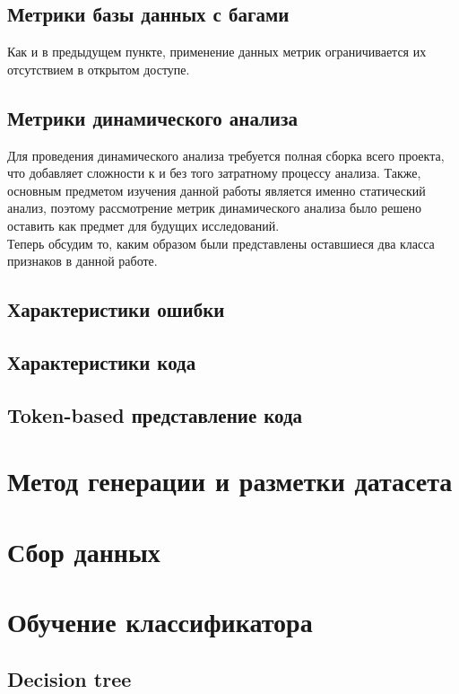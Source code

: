 \subsection{Метрики базы данных с багами}
Как и в предыдущем пункте, применение данных метрик ограничивается их отсутствием в открытом доступе.

\subsection{Метрики динамического анализа}
Для проведения динамического анализа требуется полная сборка всего проекта, что добавляет сложности к и без того затратному процессу анализа. Также, основным предметом изучения данной работы является именно статический анализ, поэтому рассмотрение метрик динамического анализа было решено оставить как предмет для будущих исследований.
\\
Теперь обсудим то, каким образом были представлены оставшиеся два класса признаков в данной работе.

\subsection{Характеристики ошибки}
\label{sec:Err-to-CWE} 

\subsection{Характеристики кода}

\subsection{Token-based представление кода}
\label{sec:Tokens} 

\section{Метод генерации и разметки датасета}

\section{Сбор данных}

\section{Обучение классификатора}

\subsection{Decision tree}
